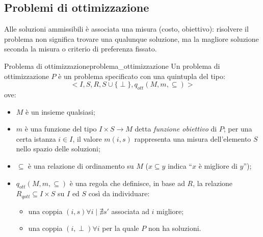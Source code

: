 \documentclass[12pt]{report}
\newcounter{definition}
\newcommand{\nmu}{}
\begin{document}
   	\subsection{Problemi di ottimizzazione}
   	Alle soluzioni ammissibili è associata una misura (costo, obiettivo): risolvere il problema non significa trovare una qualunque soluzione, ma la magliore soluzione seconda la misura o criterio di preferenza fissato.
   	\begin{definition}{\nmu Problema di ottimizzazione}{problema_ottimizzazione}
   		Un problema di ottimizzazione $P$ è un problema specificato con una quintupla del tipo:
   		\[
   		<I, S, R, S \cup \{\perp\}, q_{ott}(M, m, \subseteq)>
   		\]
   		ove:
   		\begin{itemize}
   			\item $M$ è un insieme qualsiasi;
   			\item $m$ è una funzione del tipo $I\times S \to M$ detta \textit{funzione obiettivo} di $P$; per una certa istanza $i \in I$, il valore $m(i, s)$ rappresenta una misura dell'elemento $S$ nello spazio delle soluzioni;
   			\item $\subseteq$ è una relazione di ordinamento su $M$ ($x \subseteq y$ indica ``$x$ è migliore di $y$'');
   			\item $q_{ott}(M, m, \subseteq)$ è una regola che definisce, in base ad $R$, la relazione $R_{qott} \subseteq I \times S$ su $I$ ed $S $ così da individuare:
   			\begin{itemize}
   				\item una coppia $(i, s) \forall i \mid {\nexists} s' $ associata ad $i$ migliore;
   				\item una coppia $(i, \perp) \forall i$ per la quale $P$ non ha soluzioni.
   			\end{itemize}
   		\end{itemize}
   	\end{definition}
\end{document}

